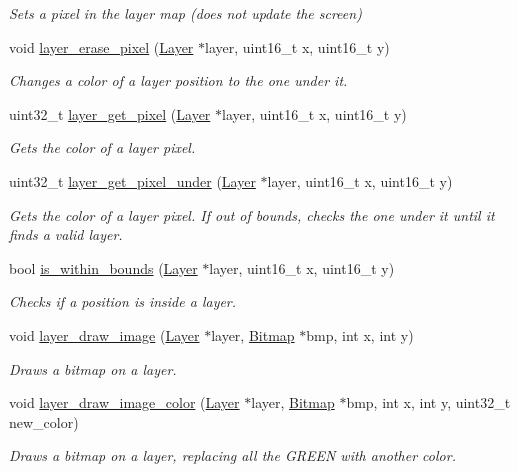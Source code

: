 \begin{DoxyCompactItemize}
\begin{DoxyCompactList}\small\item\em Sets a pixel in the layer map (does not update the screen) \end{DoxyCompactList}\item 
void \mbox{\hyperlink{group__layer_ga5c826dd6313f240df1df23f9b049e3fd}{layer\+\_\+erase\+\_\+pixel}} (\mbox{\hyperlink{struct_layer}{Layer}} $\ast$layer, uint16\+\_\+t x, uint16\+\_\+t y)
\begin{DoxyCompactList}\small\item\em Changes a color of a layer position to the one under it. \end{DoxyCompactList}\item 
uint32\+\_\+t \mbox{\hyperlink{group__layer_gab108b73fe8d04f98fa55d281c245179b}{layer\+\_\+get\+\_\+pixel}} (\mbox{\hyperlink{struct_layer}{Layer}} $\ast$layer, uint16\+\_\+t x, uint16\+\_\+t y)
\begin{DoxyCompactList}\small\item\em Gets the color of a layer pixel. \end{DoxyCompactList}\item 
uint32\+\_\+t \mbox{\hyperlink{group__layer_ga1f190aee16c183dcd256751cdbf41711}{layer\+\_\+get\+\_\+pixel\+\_\+under}} (\mbox{\hyperlink{struct_layer}{Layer}} $\ast$layer, uint16\+\_\+t x, uint16\+\_\+t y)
\begin{DoxyCompactList}\small\item\em Gets the color of a layer pixel. If out of bounds, checks the one under it until it finds a valid layer. \end{DoxyCompactList}\item 
bool \mbox{\hyperlink{group__layer_ga7f74243f1e256f7977109a1af3cfcaf2}{is\+\_\+within\+\_\+bounds}} (\mbox{\hyperlink{struct_layer}{Layer}} $\ast$layer, uint16\+\_\+t x, uint16\+\_\+t y)
\begin{DoxyCompactList}\small\item\em Checks if a position is inside a layer. \end{DoxyCompactList}\item 
void \mbox{\hyperlink{group__layer_ga9ac38361f9d11a9948ba299a6a6ad71f}{layer\+\_\+draw\+\_\+image}} (\mbox{\hyperlink{struct_layer}{Layer}} $\ast$layer, \mbox{\hyperlink{struct_bitmap}{Bitmap}} $\ast$bmp, int x, int y)
\begin{DoxyCompactList}\small\item\em Draws a bitmap on a layer. \end{DoxyCompactList}\item 
void \mbox{\hyperlink{group__layer_gaafecb163f102a681ca44cd542057370a}{layer\+\_\+draw\+\_\+image\+\_\+color}} (\mbox{\hyperlink{struct_layer}{Layer}} $\ast$layer, \mbox{\hyperlink{struct_bitmap}{Bitmap}} $\ast$bmp, int x, int y, uint32\+\_\+t new\+\_\+color)
\begin{DoxyCompactList}\small\item\em Draws a bitmap on a layer, replacing all the G\+R\+E\+EN with another color. \end{DoxyCompactList}\end{DoxyCompactItemize}
